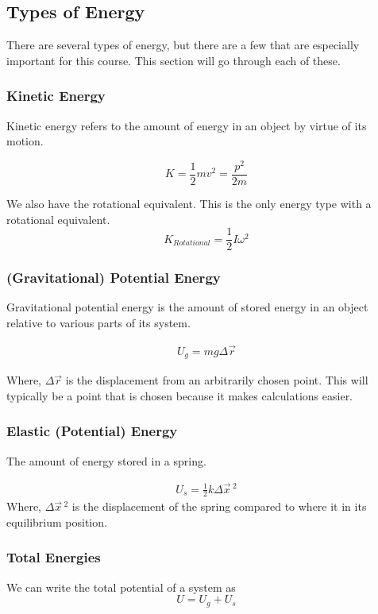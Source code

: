 \subsection{Types of Energy}
There are several types of energy, but there are a few that are especially
important for this course. This section will go through each of these.

\subsubsection{Kinetic Energy}
Kinetic energy refers to the amount of energy in an object by
virtue of its motion.

\begin{equation}
    K = \frac{1}{2}mv^2 = \frac{p^2}{2m}
\end{equation}

We also have the rotational equivalent. This is the only energy type with a rotational equivalent.
\begin{equation}
    K_{Rotational} = \frac{1}{2} I \omega ^2
\end{equation}

\subsubsection{(Gravitational) Potential Energy}
Gravitational potential energy is the amount of stored energy in an
object relative to various parts of its system.

\begin{eqnarray}
    U_g = mg \Delta \vec{r}
\end{eqnarray}

\noindent Where, $\Delta \vec{r}$ is the displacement from an arbitrarily
chosen point. This will typically be a point that is chosen because it makes
calculations easier.

\subsubsection{Elastic (Potential) Energy}
The amount of energy stored in a spring.

\begin{eqnarray}
    U_s = \frac{1}{2} k \Delta \vec{x} \, ^2
\end{eqnarray}
Where, $\Delta \vec{x} \, ^2$ is the displacement of the spring
compared to where it in its equilibrium position.

\subsubsection{Total Energies}
We can write the total potential of a system as
\begin{equation}
    U = U_g + U_s
\end{equation}

